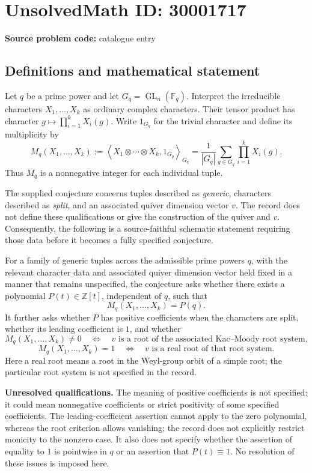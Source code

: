 \documentclass[11pt]{article}
\newcommand{\Z}{\mathbb{Z}}
\newcommand{\F}{\mathbb{F}}
\begin{document}
\section*{UnsolvedMath ID: 30001717}
\textbf{Source problem code:} catalogue entry
\subsection{Definitions and mathematical statement}
Let \(q\) be a prime power and let \(G_q=\operatorname{GL}_n(\F_q)\). Interpret the irreducible characters \(X_1,\ldots,X_k\) as ordinary complex characters. Their tensor product has character \(g\mapsto\prod_{i=1}^k X_i(g)\). Write \(1_{G_q}\) for the trivial character and define its multiplicity by
\[
M_q(X_1,\ldots,X_k):=\left\langle X_1\otimes\cdots\otimes X_k,1_{G_q}\right\rangle_{G_q}
=\frac{1}{|G_q|}\sum_{g\in G_q}\prod_{i=1}^k X_i(g).
\]
Thus \(M_q\) is a nonnegative integer for each individual tuple.

The supplied conjecture concerns tuples described as \emph{generic}, characters described as \emph{split}, and an associated quiver dimension vector \(v\). The record does not define these qualifications or give the construction of the quiver and \(v\). Consequently, the following is a source-faithful schematic statement requiring those data before it becomes a fully specified conjecture.

For a family of generic tuples across the admissible prime powers \(q\), with the relevant character data and associated quiver dimension vector held fixed in a manner that remains unspecified, the conjecture asks whether there exists a polynomial \(P(t)\in\Z[t]\), independent of \(q\), such that
\[
M_q(X_1,\ldots,X_k)=P(q).
\]
It further asks whether \(P\) has positive coefficients when the characters are split, whether its leading coefficient is \(1\), and whether
\[
M_q(X_1,\ldots,X_k)\ne0
\quad\Longleftrightarrow\quad
v\text{ is a root of the associated Kac--Moody root system},
\]
\[
M_q(X_1,\ldots,X_k)=1
\quad\Longleftrightarrow\quad
v\text{ is a real root of that root system}.
\]
Here a real root means a root in the Weyl-group orbit of a simple root; the particular root system is not specified in the record.

\textbf{Unresolved qualifications.} The meaning of positive coefficients is not specified: it could mean nonnegative coefficients or strict positivity of some specified coefficients. The leading-coefficient assertion cannot apply to the zero polynomial, whereas the root criterion allows vanishing; the record does not explicitly restrict monicity to the nonzero case. It also does not specify whether the assertion of equality to \(1\) is pointwise in \(q\) or an assertion that \(P(t)\equiv1\). No resolution of these issues is imposed here.
\end{document}
